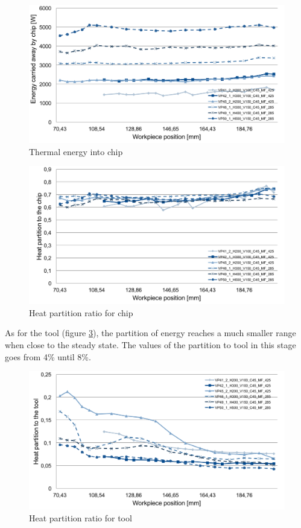 		\begin{figure}[H]
			\centering
			\captionsetup{justification=centering}
			\includegraphics[scale=0.55]{Imagens/energyChip.png}
			\caption{Thermal energy into chip}
			\label{fig:energyChip}
		\end{figure}

		\begin{figure}[H]
			\centering
			\captionsetup{justification=centering}
			\includegraphics[scale=0.55]{Imagens/PartChip.png}
			\caption{Heat partition ratio for chip}
			\label{fig:hpartChip}
		\end{figure}

		As for the tool (figure \ref{fig:hpartTool}), the partition of energy reaches a much smaller range when close to the steady state. The values of the partition to tool in this stage goes from 4\% until 8\%.

		\begin{figure}[H]
			\centering
			\captionsetup{justification=centering}
			\includegraphics[scale=0.55]{Imagens/partTool.png}
			\caption{Heat partition ratio for tool}
			\label{fig:hpartTool}
		\end{figure}